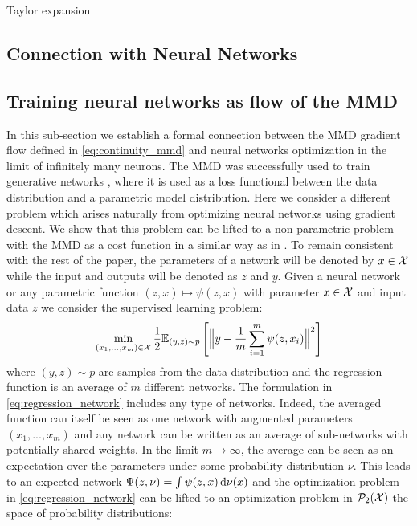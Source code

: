 \begin{lemma}
\label{lem:Taylor-expansion}Taylor expansion
\end{lemma}



\subsection{Connection with Neural Networks}\label{subsec:training_neural_networks}

\subsection{Training neural networks as flow of the MMD}
In this sub-section we establish a formal connection between the MMD gradient flow defined in \cref{eq:continuity_mmd} and neural networks optimization in the limit of infinitely many neurons.
The MMD was successfully used to train generative networks \cite{Arbel:2018,Binkowski:2018}, where it is used as a loss functional between the data distribution and a parametric model distribution.
Here we consider a different problem which arises naturally from optimizing neural networks using gradient descent. We show that this problem can be lifted to a non-parametric problem with the MMD as a cost function in a similar way as in \cite{rotskoff2018neural}. To remain consistent with the rest of the paper, the parameters of a network will be denoted by $x\in {{\mathcal X}}$ while the input and outputs will be denoted as $z$ and $y$.
 Given a neural network or any parametric function $(z,x)\mapsto \psi(z,x)$ with parameter $x \in {{\mathcal X}} $ and input data $z$ we consider the supervised learning problem:
\begin{align}\label{eq:regression_network}
	\min_{(x_1,...,x_m )\in {{\mathcal X}}} \frac{1}{2}\mathbb{E}_{(y,z)\sim p  } \left[ \Big\Vert y - \frac{1}{m}\sum_{i=1}^m\psi(z,x_i) \Big\Vert^2 \right ]
\end{align}
where $(y,z) \sim p$ are samples from the data distribution and the regression function is an average of $m$ different networks. The formulation in \cref{eq:regression_network} includes any type of networks. Indeed, the averaged function can itself be seen as one network with augmented parameters $(x_1,...,x_m)$ and any network can be written as an average of sub-networks with potentially shared weights. In the limit $m\rightarrow \infty$, the average can be seen as an expectation over the parameters under some probability distribution $\nu$. This leads to an expected network $\Psi(z,\nu) =  \int \psi(z,x) \mathop{}\!\mathrm{d} \nu(x) $ and the optimization problem in \cref{eq:regression_network} can be lifted to an optimization problem in $\mathcal{P}_2({{\mathcal X}})$ the space of probability distributions:

